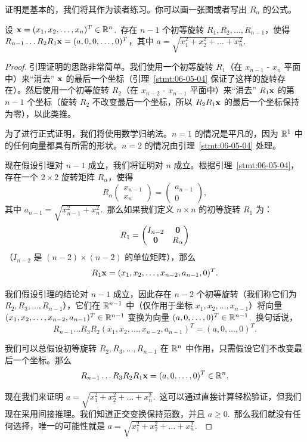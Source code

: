 证明是基本的，我们将其作为读者练习。你可以画一张图或者写出 $R_\alpha$ 的公式。

\begin{lemma}\label{stmt:06-05-05} 设 $\mathbf{x} = (x_1, x_2, \dots, x_n)^T \in \mathbb{R}^n$.~存在 $n-1$ 个初等旋转 $R_1, R_2, \dots, R_{n-1}$，使得 $R_{n-1} \dots R_2 R_1 \mathbf{x} = (a, 0, 0, \dots, 0)^T$，其中 $a = \sqrt{x_1^2 + x_2^2 + \dots + x_n^2}$.~\end{lemma}

\begin{proof} 引理证明的思路非常简单。我们使用一个初等旋转 $R_1$（在 $x_{n-1}$ - $x_n$ 平面中）来“消去” $\mathbf{x}$ 的最后一个坐标（引理~\ref{stmt:06-05-04} 保证了这样的旋转存在）。然后使用一个初等旋转 $R_2$（在 $x_{n-2}$ - $x_{n-1}$ 平面中）来“消去” $R_1 \mathbf{x}$ 的第 $n-1$ 个坐标（旋转 $R_2$ 不改变最后一个坐标，所以 $R_2 R_1 \mathbf{x}$ 的最后一个坐标保持为零），以此类推。

为了进行正式证明，我们将使用数学归纳法。$n=1$ 的情况是平凡的，因为 $\mathbb{R}^1$ 中的任何向量都具有所需的形状。$n=2$ 的情况由引理~\ref{stmt:06-05-04} 处理。

现在假设引理对 $n-1$ 成立，我们将证明对 $n$ 成立。根据引理~\ref{stmt:06-05-04}，存在一个 $2 \times 2$ 旋转矩阵 $R_\alpha$，使得
$$R_\alpha \begin{pmatrix} x_{n-1} \\ x_n \end{pmatrix} = \begin{pmatrix} a_{n-1} \\ 0 \end{pmatrix},$$其中 $a_{n-1} = \sqrt{x_{n-1}^2 + x_n^2}$.~那么如果我们定义 $n \times n$ 的初等旋转 $R_1$ 为：
$$R_1 = \begin{pmatrix} I_{n-2} & \mathbf{0} \\ \mathbf{0} & R_\alpha \end{pmatrix}$$
（$I_{n-2}$ 是 $(n-2) \times (n-2)$ 的单位矩阵），那么 $$R_1 \mathbf{x} = (x_1, x_2, \dots, x_{n-2}, a_{n-1}, 0)^T.$$

我们假设引理的结论对 $n-1$ 成立，因此存在 $n-2$ 个初等旋转（我们称它们为 $R_2, R_3, \dots, R_{n-1}$），它们在 $\mathbb{R}^{n-1}$ 中（仅作用于坐标 $x_1, x_2, \dots, x_{n-1}$）将向量 $(x_1, x_2, \dots, x_{n-2}, a_{n-1})^T \in \mathbb{R}^{n-1}$ 变换为向量 $(a, 0, \dots, 0)^T \in \mathbb{R}^{n-1}$.~换句话说，
$$R_{n-1} \dots R_3 R_2 (x_1, x_2, \dots, x_{n-2}, a_{n-1})^T = (a, 0, \dots, 0)^T.$$

我们可以总假设初等旋转 $R_2, R_3, \dots, R_{n-1}$ 在 $\mathbb{R}^n$ 中作用，只需假设它们不改变最后一个坐标。那么 $$R_{n-1} \dots R_3 R_2 R_1 \mathbf{x} = (a, 0, \dots, 0)^T \in \mathbb{R}^n.$$

现在我们来证明 $a = \sqrt{x_1^2 + x_2^2 + \dots + x_n^2}$.~这可以通过直接计算轻松验证，但我们现在采用间接推理。我们知道正交变换保持范数，并且 $a \ge 0$.~那么我们就没有任何选择，唯一的可能性就是 $a = \sqrt{x_1^2 + x_2^2 + \dots + x_n^2}$.~\end{proof}


